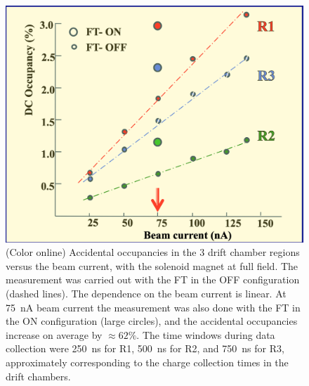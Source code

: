 \documentclass[final,3p,twocolumn]{elsarticle}
\begin{document}
\begin{figure}[htbp!]
\centerline{\includegraphics[width=1.0\columnwidth]{random-trigger-occupancies.png}}
\caption{(Color online) Accidental occupancies in the 3 drift chamber regions versus the beam current, with 
the solenoid magnet at full 
field. The measurement was carried out with the FT in the OFF configuration (dashed lines). The dependence on the beam
current is linear. At 75~nA beam current the measurement was also done with the FT in the ON configuration (large circles),
and the accidental occupancies increase on average by $\approx 62\%$. The time windows during data collection were 
250~ns for R1, 500~ns for R2, and 750~ns for R3, approximately corresponding to the charge collection times in the drift chambers.}
\label{occupancies1}
\end{figure}
\end{document}
